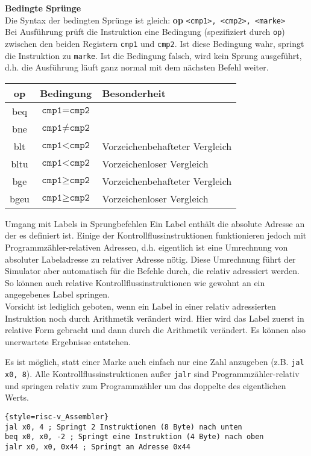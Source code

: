 {\textbf{Bedingte Sprünge}\\

Die Syntax der bedingten Sprünge ist gleich: \textbf{op} \texttt{<cmp1>, <cmp2>, <marke>}\\
Bei Ausführung prüft die Instruktion eine Bedingung (spezifiziert durch \texttt{op}) zwischen den beiden Registern \texttt{cmp1} und \texttt{cmp2}. Ist diese Bedingung wahr, springt die Instruktion zu \texttt{marke}. Ist die Bedingung falsch, wird kein Sprung ausgeführt, d.h. die Ausführung läuft ganz normal mit dem nächsten Befehl weiter.\\
\begin{tabular}{|c|c|l|}
	\hline
	op & Bedingung & Besonderheit\\
	\hline
	beq & $\texttt{cmp1} = \texttt{cmp2}$ & \\
	\hline
	bne & $\texttt{cmp1} \ne \texttt{cmp2}$ & \\
	\hline
	blt & $\texttt{cmp1} < \texttt{cmp2}$ & Vorzeichenbehafteter Vergleich\\
	\hline
	bltu & $\texttt{cmp1} < \texttt{cmp2}$ & Vorzeichenloser Vergleich\\
	\hline
	bge & $\texttt{cmp1} \ge \texttt{cmp2}$ & Vorzeichenbehafteter Vergleich\\
	\hline
	bgeu & $\texttt{cmp1} \ge \texttt{cmp2}$ & Vorzeichenloser Vergleich\\
	\hline
\end{tabular}

\begin{infoblock}{Umgang mit Labels in Sprungbefehlen}
	Ein Label enthält die absolute Adresse an der es definiert ist. Einige der Kontrollflussinstruktionen funktionieren jedoch mit Programmzähler-relativen Adressen, d.h. eigentlich ist eine Umrechnung von absoluter Labeladresse zu relativer Adresse nötig. Diese Umrechnung führt der Simulator aber automatisch für die Befehle durch, die relativ adressiert werden. So können auch relative Kontrollflussinstruktionen wie gewohnt an ein angegebenes Label springen.\\
	Vorsicht ist lediglich geboten, wenn ein Label in einer relativ adressierten Instruktion noch durch Arithmetik verändert wird. Hier wird das Label zuerst in relative Form gebracht und dann durch die Arithmetik verändert. Es können also unerwartete Ergebnisse entstehen.
\end{infoblock}

\begin{warningblock}
	Es ist möglich, statt einer Marke auch einfach nur eine Zahl anzugeben (z.B. \texttt{jal x0, 8}).
	Alle Kontrollflussinstruktionen außer \texttt{jalr} sind Programmzähler-relativ und springen relativ zum Programmzähler um das doppelte des eigentlichen Werts.\\
\begin{lstlisting}{style=risc-v_Assembler}
jal x0, 4 ; Springt 2 Instruktionen (8 Byte) nach unten
beq x0, x0, -2 ; Springt eine Instruktion (4 Byte) nach oben
jalr x0, x0, 0x44 ; Springt an Adresse 0x44
\end{lstlisting}
\end{warningblock}


}
